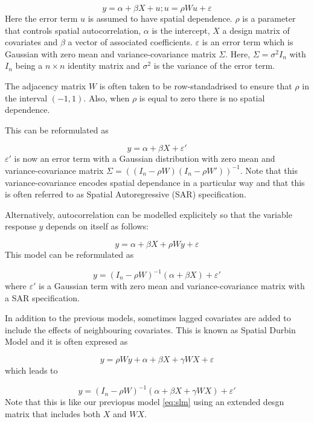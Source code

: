 \documentclass[article]{jss}
\begin{document}
\begin{equation}
y= \alpha+\beta X +u; u=\rho W u+\varepsilon
\end{equation}
\noindent
Here the error term $u$ is assumed to have spatial dependence.  $\rho$ is a
parameter that controls spatial autocorrelation, $\alpha$ is the intercept, $X$
a design matrix of covariates and $\beta$ a vector of associated coefficients.
$\varepsilon$ is an error term which is Gaussian with zero mean and
variance-covariance matrix $\Sigma$. Here, $\Sigma = \sigma^2 I_n$ with $I_n$
being a $n\times n$ identity matrix and $\sigma^2$ is the variance of the error
term.


The adjacency matrix $W$ is often taken to be row-standadrised \citep[see, for
example,][]{Haining:2003} to ensure that $\rho$ in the interval $(-1, 1)$.
Also, when $\rho$ is equal to zero there is no spatial dependence.

This can be reformulated as

\begin{equation}
y= \alpha+\beta X+\varepsilon'
\end{equation}
\noindent
$\varepsilon '$ is now an error term with a Gaussian distribution with zero
mean and variance-covariance matrix $\Sigma=((I_n-\rho W)(I_n-\rho W'))^{-1}$.
Note that this variance-covariance encodes spatial dependance in a particular
way and that this is often referred to as Spatial Autoregressive (SAR)
specification.


Alternatively, autocorrelation can be modelled explicitely so that the
variable response $y$ depends on itself as follows:

$$
y= \alpha+\beta X+\rho W y +\varepsilon 
$$
\noindent
This model can be reformulated as

\begin{equation}
y = (I_n-\rho W)^{-1}(\alpha+\beta X)+\varepsilon ' 
\label{eq:slm}
\end{equation}
\noindent
where $\varepsilon '$ is a Gaussian term with zero mean and
variance-covariance matrix with a SAR specification.

In addition to the previous models, sometimes lagged covariates are 
added to include the effects of neighbouring covariates. This is known
as Spatial Durbin Model  and it is often expresed as

$$
y= \rho W y+ \alpha+\beta X+\gamma W X +\varepsilon 
$$
\noindent
which leads to

$$
y= (I_n-\rho W)^{-1}(\alpha+\beta X+\gamma W X) +\varepsilon '
$$
\noindent
Note that this is like our previopus model \ref{eq:slm} using an extended desgn
matrix that includes both $X$ and $W X$.
\end{document}
